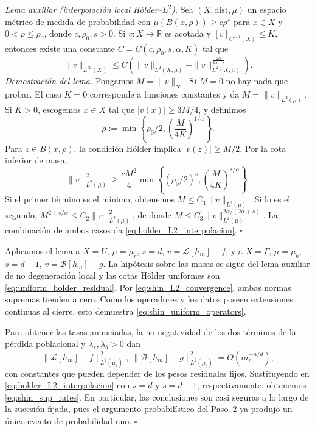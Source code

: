 \medskip
\noindent\textit{Lema auxiliar (interpolación local Hölder--$L^2$).}
Sea $(X,\mathrm{dist},\mu)$ un espacio métrico de medida de probabilidad
con $\mu(B(x,\rho))\geq c\rho^s$ para $x\in X$ y
$0<\rho\leq\rho_0$, donde $c,\rho_0,s>0$. Si $v:X\to\mathbb R$
es acotada y $[v]_{C^{0,\alpha}(X)}\leq K$, entonces existe una
constante $C=C(c,\rho_0,s,\alpha,K)$ tal que
\begin{equation}\label{eq:holder_L2_interpolacion}
\|v\|_{L^\infty(X)}\leq
C\left(\|v\|_{L^2(X;\mu)}+
\|v\|_{L^2(X;\mu)}^{\frac{2\alpha}{2\alpha+s}}\right).
\end{equation}
\emph{Demostración del lema.}
Pongamos $M=\|v\|_\infty$. Si $M=0$ no hay nada que probar.
El caso $K=0$ corresponde a funciones constantes y da
$M=\|v\|_{L^2(\mu)}$. Si $K>0$, escogemos $x\in X$ tal que
$|v(x)|\geq3M/4$, y definimos
\[
\rho:=\min\!\left\{\rho_0/2,\left(\frac{M}{4K}\right)^{1/\alpha}\right\}.
\]
Para $z\in B(x,\rho)$, la condición Hölder implica
$|v(z)|\geq M/2$. Por la cota inferior de masa,
\begin{equation}\label{eq:holder_L2_mass}
\|v\|_{L^2(\mu)}^2\geq
\frac{cM^2}{4}\min\!\left\{(\rho_0/2)^s,
\left(\frac{M}{4K}\right)^{s/\alpha}\right\}.
\end{equation}
Si el primer término es el mínimo, obtenemos
$M\leq C_1\|v\|_{L^2(\mu)}$. Si lo es el segundo,
$M^{2+s/\alpha}\leq C_2\|v\|_{L^2(\mu)}^2$, de donde
$M\leq C_3\|v\|_{L^2(\mu)}^{2\alpha/(2\alpha+s)}$.
La combinación de ambos casos da \eqref{eq:holder_L2_interpolacion}.
\hfill$\square$

\medskip
Aplicamos el lema a $X=U$, $\mu=\mu_r$, $s=d$, $v=\mathcal L[h_m]-f$;
y a $X=\Gamma$, $\mu=\mu_b$, $s=d-1$,
$v=\mathcal B[h_m]-g$. La hipótesis sobre las masas se sigue del
lema auxiliar de no degeneración local y las cotas Hölder uniformes son
\eqref{eq:uniform_holder_residual}. Por
\eqref{eq:shin_L2_convergence}, ambas normas supremas tienden a cero.
Como los operadores y los datos poseen extensiones continuas al cierre,
esto demuestra \eqref{eq:shin_uniform_operators}.

Para obtener las tasas anunciadas, la no negatividad de los dos términos
de la pérdida poblacional y $\lambda_r,\lambda_b>0$ dan
\[
\|\mathcal L[h_m]-f\|_{L^2(\mu_r)}^2,
\ \|\mathcal B[h_m]-g\|_{L^2(\mu_b)}^2
=O(m_r^{-\alpha/d}),
\]
con constantes que pueden depender de los pesos residuales fijos.
Sustituyendo en \eqref{eq:holder_L2_interpolacion} con
$s=d$ y $s=d-1$, respectivamente, obtenemos
\eqref{eq:shin_sup_rates}. En particular, las conclusiones son casi
seguras a lo largo de la sucesión fijada, pues el argumento
probabilístico del Paso~2 ya produjo un único evento de probabilidad uno.
\hfill$\square$

